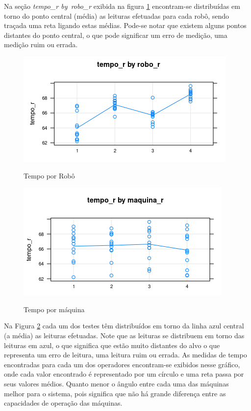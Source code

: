 \documentclass[
12pt,					%
openright,				%
oneside,				%
a4paper,				%
english,
brazil
]{ABNT/abntex2_report}
\begin{document}
Na seção \textit{tempo\_r by\ robo\_r} exibida na figura \ref{fig:tempo_robo} encontram-se distribuídas em torno do ponto central (média) as leituras efetuadas para cada robô, sendo traçada uma reta ligando estas médias. Pode-se notar que existem alguns pontos distantes do ponto central, o que pode significar um erro de medição, uma medição ruim ou errada.
\begin{figure}[H]
	\caption{Tempo por Robô}
	\includegraphics[]{figures/graf2.png}
	\label{fig:tempo_robo}
\end{figure}

\begin{figure}[H]
	\centering
	\caption{Tempo por máquina}
	\includegraphics[scale = 1]{figures/graf4.png}
	\label{fig:graf4}
\end{figure}

Na Figura \ref{fig:graf4} cada um dos testes têm distribuídos em torno da linha azul central (a média) as leituras efetuadas. Note que as leituras se distribuem em torno das leituras em azul, o que significa que estão muito distantes do alvo o que representa um erro de leitura, uma leitura ruim ou errada. As medidas de tempo encontradas para cada um dos operadores encontram-se exibidos nesse gráfico, onde cada valor encontrado é representado por um círculo e uma reta passa por seus valores médios. Quanto menor o ângulo entre cada uma das máquinas melhor para o sistema, pois significa que não há grande diferença entre as capacidades de operação das máquinas.
\end{document}
